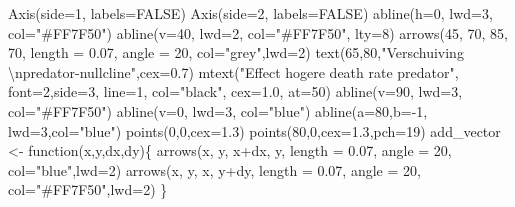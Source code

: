 \documentclass[
  a4paper,
]{scrbook}
\newenvironment{Shaded}{\begin{snugshade}}{\end{snugshade}}
\newcommand{\AttributeTok}[1]{\textcolor[rgb]{0.40,0.45,0.13}{#1}}
\newcommand{\ConstantTok}[1]{\textcolor[rgb]{0.56,0.35,0.01}{#1}}
\newcommand{\ControlFlowTok}[1]{\textcolor[rgb]{0.00,0.23,0.31}{#1}}
\newcommand{\DecValTok}[1]{\textcolor[rgb]{0.68,0.00,0.00}{#1}}
\newcommand{\FloatTok}[1]{\textcolor[rgb]{0.68,0.00,0.00}{#1}}
\newcommand{\FunctionTok}[1]{\textcolor[rgb]{0.28,0.35,0.67}{#1}}
\newcommand{\NormalTok}[1]{\textcolor[rgb]{0.00,0.23,0.31}{#1}}
\newcommand{\OtherTok}[1]{\textcolor[rgb]{0.00,0.23,0.31}{#1}}
\newcommand{\SpecialCharTok}[1]{\textcolor[rgb]{0.37,0.37,0.37}{#1}}
\newcommand{\StringTok}[1]{\textcolor[rgb]{0.13,0.47,0.30}{#1}}
\theoremstyle{definition}
\theoremstyle{remark}
\begin{document}
\begin{Shaded}
\begin{Highlighting}[]
\FunctionTok{Axis}\NormalTok{(}\AttributeTok{side=}\DecValTok{1}\NormalTok{, }\AttributeTok{labels=}\ConstantTok{FALSE}\NormalTok{)}
\FunctionTok{Axis}\NormalTok{(}\AttributeTok{side=}\DecValTok{2}\NormalTok{, }\AttributeTok{labels=}\ConstantTok{FALSE}\NormalTok{)}
\FunctionTok{abline}\NormalTok{(}\AttributeTok{h=}\DecValTok{0}\NormalTok{, }\AttributeTok{lwd=}\DecValTok{3}\NormalTok{, }\AttributeTok{col=}\StringTok{"\#FF7F50"}\NormalTok{)}
\FunctionTok{abline}\NormalTok{(}\AttributeTok{v=}\DecValTok{40}\NormalTok{, }\AttributeTok{lwd=}\DecValTok{2}\NormalTok{, }\AttributeTok{col=}\StringTok{"\#FF7F50"}\NormalTok{, }\AttributeTok{lty=}\DecValTok{8}\NormalTok{)}
\FunctionTok{arrows}\NormalTok{(}\DecValTok{45}\NormalTok{, }\DecValTok{70}\NormalTok{, }\DecValTok{85}\NormalTok{, }\DecValTok{70}\NormalTok{, }\AttributeTok{length =} \FloatTok{0.07}\NormalTok{, }\AttributeTok{angle =} \DecValTok{20}\NormalTok{, }\AttributeTok{col=}\StringTok{"grey"}\NormalTok{,}\AttributeTok{lwd=}\DecValTok{2}\NormalTok{)}
\FunctionTok{text}\NormalTok{(}\DecValTok{65}\NormalTok{,}\DecValTok{80}\NormalTok{,}\StringTok{"Verschuiving }\SpecialCharTok{\textbackslash{}n}\StringTok{predator{-}nullcline"}\NormalTok{,}\AttributeTok{cex=}\FloatTok{0.7}\NormalTok{)}
\FunctionTok{mtext}\NormalTok{(}\StringTok{"Effect hogere death rate predator"}\NormalTok{, }\AttributeTok{font=}\DecValTok{2}\NormalTok{,}\AttributeTok{side=}\DecValTok{3}\NormalTok{, }\AttributeTok{line=}\DecValTok{1}\NormalTok{, }\AttributeTok{col=}\StringTok{"black"}\NormalTok{, }\AttributeTok{cex=}\FloatTok{1.0}\NormalTok{, }\AttributeTok{at=}\DecValTok{50}\NormalTok{)}
\FunctionTok{abline}\NormalTok{(}\AttributeTok{v=}\DecValTok{90}\NormalTok{, }\AttributeTok{lwd=}\DecValTok{3}\NormalTok{, }\AttributeTok{col=}\StringTok{"\#FF7F50"}\NormalTok{)}
\FunctionTok{abline}\NormalTok{(}\AttributeTok{v=}\DecValTok{0}\NormalTok{, }\AttributeTok{lwd=}\DecValTok{3}\NormalTok{, }\AttributeTok{col=}\StringTok{"blue"}\NormalTok{)}
\FunctionTok{abline}\NormalTok{(}\AttributeTok{a=}\DecValTok{80}\NormalTok{,}\AttributeTok{b=}\SpecialCharTok{{-}}\DecValTok{1}\NormalTok{, }\AttributeTok{lwd=}\DecValTok{3}\NormalTok{,}\AttributeTok{col=}\StringTok{"blue"}\NormalTok{)}
\FunctionTok{points}\NormalTok{(}\DecValTok{0}\NormalTok{,}\DecValTok{0}\NormalTok{,}\AttributeTok{cex=}\FloatTok{1.3}\NormalTok{)}
\FunctionTok{points}\NormalTok{(}\DecValTok{80}\NormalTok{,}\DecValTok{0}\NormalTok{,}\AttributeTok{cex=}\FloatTok{1.3}\NormalTok{,}\AttributeTok{pch=}\DecValTok{19}\NormalTok{)}
\NormalTok{add\_vector }\OtherTok{\textless{}{-}} \ControlFlowTok{function}\NormalTok{(x,y,dx,dy)\{}
  \FunctionTok{arrows}\NormalTok{(x, y, x}\SpecialCharTok{+}\NormalTok{dx, y, }\AttributeTok{length =} \FloatTok{0.07}\NormalTok{, }\AttributeTok{angle =} \DecValTok{20}\NormalTok{, }\AttributeTok{col=}\StringTok{"blue"}\NormalTok{,}\AttributeTok{lwd=}\DecValTok{2}\NormalTok{)}
  \FunctionTok{arrows}\NormalTok{(x, y, x, y}\SpecialCharTok{+}\NormalTok{dy, }\AttributeTok{length =} \FloatTok{0.07}\NormalTok{, }\AttributeTok{angle =} \DecValTok{20}\NormalTok{, }\AttributeTok{col=}\StringTok{"\#FF7F50"}\NormalTok{,}\AttributeTok{lwd=}\DecValTok{2}\NormalTok{)}
\NormalTok{\}}


\end{Highlighting}
\end{Shaded}
\end{document}
